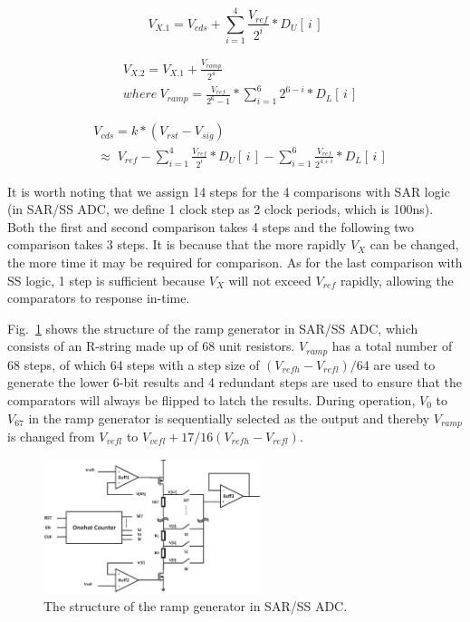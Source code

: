 \begin{equation}
	V_{X.1}=V_{cds}+\sum_{i=1}^{4} {\frac{V_{ref}}{2^{i}}\ast{D_{U}\left[\,i\,\right]}}
	\label{eq4}
\end{equation}

\begin{equation}
	\begin{aligned}
		&V_{X.2}=V_{X.1}+\frac{V_{ramp}}{2^4}\\ &where\  V_{ramp}=\frac{V_{ref}}{2^6-1}\ast\sum_{i=1}^{6}2^{6-i}\ast{D_{L}\left[\,i\,\right]}
		\label{eq5}
	\end{aligned}	
\end{equation}

\begin{equation}
	\begin{aligned}
		&V_{cds}=k\ast(V_{rst}-V_{sig})\\
		&\;{\approx}\;{V_{ref}-\sum_{i=1}^{4} \frac{V_{ref}}{2^{i}}\ast{D_{U}\left[\,i\,\right]}-\sum_{i=1}^{6} \frac{V_{ref}}{2^{4+i}}\ast{D_{L}\left[\,i\,\right]}}
		\label{eq6}
	\end{aligned}
\end{equation}

It is worth noting that we assign 14 steps for the 4 comparisons with SAR logic (in SAR/SS ADC, we define 1 clock step as 2 clock periods, which is 100ns). Both the first and second comparison takes 4 steps and the following two comparison takes 3 steps. It is because that the more rapidly $V_{X}$ can be changed, the more time it may be required for comparison. As for the last comparison with SS logic, 1 step is sufficient because $V_{X}$ will not exceed $V_{ref}$ rapidly, allowing the comparators to response in-time.

Fig.~\ref{RRAMP} shows the structure of the ramp generator in SAR/SS ADC, which consists of an R-string made up of 68 unit resistors. $V_{ramp}$ has a total number of 68 steps,
of which 64 steps with a step size of $(V_{refh}-V_{refl})/64$ are used to generate the lower 6-bit results and 4 redundant steps are used to ensure that the comparators 
will always be flipped to latch the results. During operation, $V_{0}$ to $V_{67}$ in the ramp generator is sequentially selected as the output and thereby 
$V_{ramp}$ is changed from $V_{vefl}$ to $V_{vefl}+17/16(V_{refh}-V_{refl})$.

\begin{figure}[htbp] 
	\centerline{\includegraphics[width=2.5in]{./Figures/RRAMP.eps}}
	\caption{The structure of the ramp generator in SAR/SS ADC.}
	\label{RRAMP}
\end{figure}


